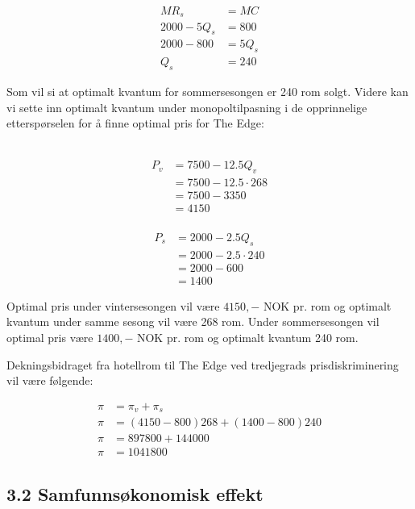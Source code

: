 \documentclass[
  12pt,
  a4paper,
  DIV=11,
  numbers=noendperiod]{scrartcl}
\begin{document}
\begin{align*}
MR_s &= MC \\
2000 - 5Q_s &= 800 \\
2000 - 800 &= 5Q_s \\
Q_s &= 240
\end{align*}

Som vil si at optimalt kvantum for sommersesongen er 240 rom solgt.
Videre kan vi sette inn optimalt kvantum under monopoltilpasning i de
opprinnelige etterspørselen for å finne optimal pris for The Edge:

 \\
\begin{align*}
P_v &= 7500 - 12.5Q_v \\
&= 7500 - 12.5 \cdot 268 \\
&= 7500 - 3350 \\
&= 4150
\end{align*}
 \\
\begin{align*}
P_s &= 2000 - 2.5Q_s \\
&= 2000 - 2.5 \cdot 240 \\
&= 2000 - 600 \\
&= 1400
\end{align*}

Optimal pris under vintersesongen vil være \(4150,-\) NOK pr. rom og
optimalt kvantum under samme sesong vil være 268 rom. Under
sommersesongen vil optimal pris være \(1400,-\) NOK pr. rom og optimalt
kvantum 240 rom.

Dekningsbidraget fra hotellrom til The Edge ved tredjegrads
prisdiskriminering vil være følgende:

\begin{align*}
\pi &= \pi_v + \pi_s \\
\pi &= (4150-800) 268 + (1400-800)240 \\
\pi &= 897800 + 144000 \\
\pi &= 1041800
\end{align*}

\clearpage

\subsection{3.2 Samfunnsøkonomisk
effekt}\label{samfunnsuxf8konomisk-effekt}
\end{document}
